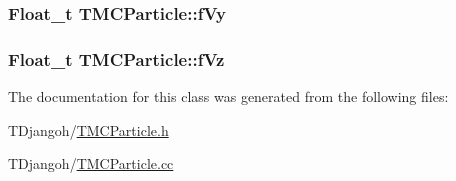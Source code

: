 \hypertarget{class_t_m_c_particle_aee87c1f1cf38d4133fc0fa90f418a279}{
\subsubsection[{f\+Vy}]{\setlength{\rightskip}{0pt plus 5cm}Float\+\_\+t T\+M\+C\+Particle\+::f\+Vy\hspace{0.3cm}{\ttfamily [private]}}}\label{class_t_m_c_particle_aee87c1f1cf38d4133fc0fa90f418a279}
\hypertarget{class_t_m_c_particle_a9d284f979bbb272eacc2f9dc2771790a}{
\subsubsection[{f\+Vz}]{\setlength{\rightskip}{0pt plus 5cm}Float\+\_\+t T\+M\+C\+Particle\+::f\+Vz\hspace{0.3cm}{\ttfamily [private]}}}\label{class_t_m_c_particle_a9d284f979bbb272eacc2f9dc2771790a}


The documentation for this class was generated from the following files\+:\begin{DoxyCompactItemize}
\item 
T\+Djangoh/\hyperlink{_t_m_c_particle_8h}{T\+M\+C\+Particle.\+h}\item 
T\+Djangoh/\hyperlink{_t_m_c_particle_8cc}{T\+M\+C\+Particle.\+cc}\end{DoxyCompactItemize}
